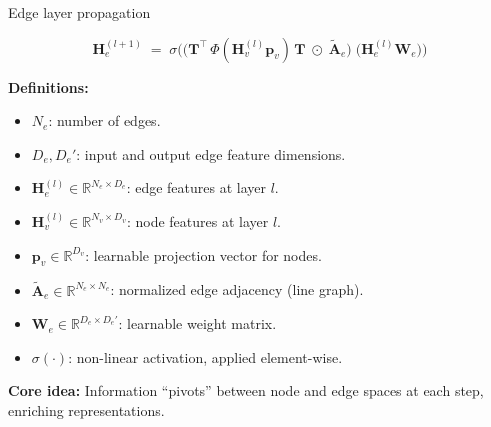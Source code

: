 \documentclass[hyperref={colorlinks,citecolor=blue,linkcolor=blue,urlcolor=blue}]{beamer}
\begin{document}
\begin{frame}{Edge layer propagation}
\footnotesize

\[
\mathbf{H}_e^{(l+1)} \;=\; \sigma\Big(
\big( \mathbf{T}^\top \,\Phi(\mathbf{H}_v^{(l)}\mathbf{p}_v)\,\mathbf{T} \;\odot\; \tilde{\mathbf{A}}_e \big)
\; \big(\mathbf{H}_e^{(l)} \mathbf{W}_e \big)
\Big)
\]

\vspace{0.5cm}

\textbf{Definitions:}
\begin{itemize}\footnotesize
    \item \(N_e\): number of edges.
    \item \(D_e, D_e'\): input and output edge feature dimensions.
    \item \(\mathbf{H}_e^{(l)} \in \mathbb{R}^{N_e \times D_e}\): edge features at layer \(l\).
    \item \(\mathbf{H}_v^{(l)} \in \mathbb{R}^{N_v \times D_v}\): node features at layer \(l\).
    \item \(\mathbf{p}_v \in \mathbb{R}^{D_v}\): learnable projection vector for nodes.
    \item \(\tilde{\mathbf{A}}_e \in \mathbb{R}^{N_e \times N_e}\): normalized edge adjacency (line graph).
    \item \(\mathbf{W}_e \in \mathbb{R}^{D_e \times D_e'}\): learnable weight matrix.
    \item \(\sigma(\cdot)\): non-linear activation, applied element-wise.
\end{itemize}
\textbf{Core idea:} Information “pivots” between node and edge spaces at each step, enriching representations.

\end{frame}
\end{document}
